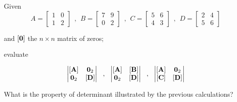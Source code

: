 \bexo
Given
\begin{equation}
	A = \begin{bmatrix}
		1& 0\\ 1& 2
	\end{bmatrix}
	~~,~~
	B = \begin{bmatrix}
		7& 9\\ 0& 2
	\end{bmatrix}
	~~,~~
	C = \begin{bmatrix}
		5& 6\\ 4& 3
	\end{bmatrix}
	~~,~~
	D = \begin{bmatrix}
		2& 4\\ 5& 6
	\end{bmatrix}
\end{equation}

and $[\textbf{0}]$ the  $n\times n$ matrix of zeros;

evaluate

\begin{equation}
\left|\begin{matrix}
	\left[ \textbf{A} \right]& \mathbf{0}_2\\
	\mathbf{0}_2 & \left[ \textbf{D} \right]\\
\end{matrix}\right|
~~,~~
\left|\begin{matrix}
	\left[ \textbf{A} \right]& \left[ \textbf{B} \right]\\
	\mathbf{0}_2 & \left[ \textbf{D} \right]\\
\end{matrix}\right|
~~,~~
\left|\begin{matrix}
	\left[ \textbf{A} \right]& \mathbf{0}_2\\
	\left[ \textbf{C} \right] & \left[ \textbf{D} \right]\\
\end{matrix}\right|
\end{equation}

What is the property of determinant illustrated by the previous calculations?
\eexo


